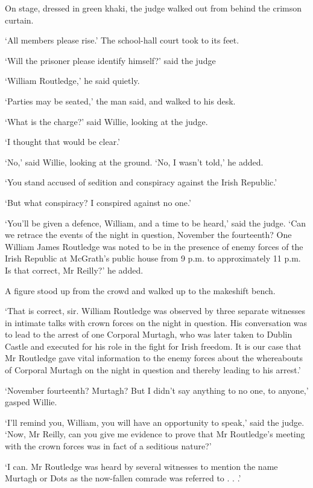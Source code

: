 \documentclass[10pt,a4paper]{article}
\begin{document}
On stage, dressed in green khaki, the judge walked out from behind the crimson curtain.

‘All members please rise.’ The school-hall court took to its feet.

‘Will the prisoner please identify himself?’ said the judge

‘William Routledge,’ he said quietly.

‘Parties may be seated,’ the man said, and walked to his desk.

‘What is the charge?’ said Willie, looking at the judge.

‘I thought that would be clear.’

‘No,’ said Willie, looking at the ground. ‘No, I wasn’t told,’ he added.

‘You stand accused of sedition and conspiracy against the Irish Republic.’

‘But what conspiracy? I conspired against no one.’

‘You’ll be given a defence, William, and a time to be heard,’ said the judge. ‘Can we retrace the events of the night in question, November the fourteenth? One William James Routledge was noted to be in the presence of enemy forces of the Irish Republic at McGrath’s public house from 9 p.m. to approximately 11 p.m. Is that correct, Mr Reilly?’ he added.

A figure stood up from the crowd and walked up to the makeshift bench.

‘That is correct, sir. William Routledge was observed by three separate witnesses in intimate talks with crown forces on the night in question. His conversation was to lead to the arrest of one Corporal Murtagh, who was later taken to Dublin Castle and executed for his role in the fight for Irish freedom. It is our case that Mr Routledge gave vital information to the enemy forces about the whereabouts of Corporal Murtagh on the night in question and thereby leading to his arrest.’

‘November fourteenth? Murtagh? But I didn’t say anything to no one, to anyone,’ gasped Willie.

‘I’ll remind you, William, you will have an opportunity to speak,’ said the judge. ‘Now, Mr Reilly, can you give me evidence to prove that Mr Routledge’s meeting with the crown forces was in fact of a seditious nature?’

‘I can. Mr Routledge was heard by several witnesses to mention the name Murtagh or Dots as the now-fallen comrade was referred to . . .’
\end{document}
